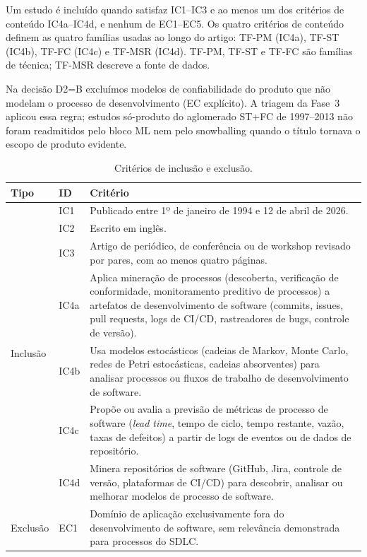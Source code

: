\documentclass[preprint,12pt,authoryear=false]{elsarticle}
\newcommand{\PM}{TF-PM}
\newcommand{\ST}{TF-ST}
\newcommand{\FC}{TF-FC}
\newcommand{\MSR}{TF-MSR}
\begin{document}
Um estudo é incluído quando satisfaz IC1--IC3 e ao menos um dos critérios de conteúdo IC4a--IC4d, e nenhum de EC1--EC5. Os quatro critérios de conteúdo definem as quatro famílias usadas ao longo do artigo: \PM{} (IC4a), \ST{} (IC4b), \FC{} (IC4c) e \MSR{} (IC4d). \PM{}, \ST{} e \FC{} são famílias de técnica; \MSR{} descreve a fonte de dados.

Na decisão D2=B excluímos modelos de confiabilidade do produto que não modelam o processo de desenvolvimento (EC explícito). A triagem da Fase~3 aplicou essa regra; estudos só-produto do aglomerado ST+FC de 1997--2013 não foram readmitidos pelo bloco ML nem pelo snowballing quando o título tornava o escopo de produto evidente.

\begin{table}[t]
\centering\small
\caption{Critérios de inclusão e exclusão.}\label{tab:criteria}
\begin{tabularx}{\textwidth}{llX}
\toprule
Tipo & ID & Critério \\
\midrule
\multirow{7}{*}{Inclusão}
 & IC1 & Publicado entre 1º de janeiro de 1994 e 12 de abril de 2026. \\
 & IC2 & Escrito em inglês. \\
 & IC3 & Artigo de periódico, de conferência ou de workshop revisado por pares, com ao menos quatro páginas. \\
 & IC4a & Aplica mineração de processos (descoberta, verificação de conformidade, monitoramento preditivo de processos) a artefatos de desenvolvimento de software (commits, issues, pull requests, logs de CI/CD, rastreadores de bugs, controle de versão). \\
 & IC4b & Usa modelos estocásticos (cadeias de Markov, Monte Carlo, redes de Petri estocásticas, cadeias absorventes) para analisar processos ou fluxos de trabalho de desenvolvimento de software. \\
 & IC4c & Propõe ou avalia a previsão de métricas de processo de software (\emph{lead time}, tempo de ciclo, tempo restante, vazão, taxas de defeitos) a partir de logs de eventos ou de dados de repositório. \\
 & IC4d & Minera repositórios de software (GitHub, Jira, controle de versão, plataformas de CI/CD) para descobrir, analisar ou melhorar modelos de processo de software. \\
\midrule
\multirow{5}{*}{Exclusão}
 & EC1 & Domínio de aplicação exclusivamente fora do desenvolvimento de software, sem relevância demonstrada para processos do SDLC. \\

\end{tabularx}
\end{table}
\end{document}
